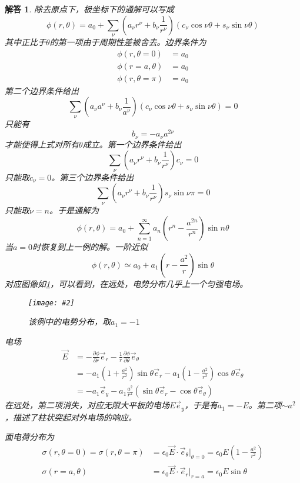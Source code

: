 \documentclass[a4paper,11pt]{ctexbook}
\newcommand{\cpic}[2]{
\begin{center}
\texttt{[image: \#2]}
\end{center}
}
\newcommand{\cpicn}[3]
{
\begin{figure}[H]
\cpic{#1}{#2}
\caption{#3\label{#2}}
\end{figure}
}
\newtheorem{ans}{解答}[section]
\newcommand{\beq}{\begin{equation}}
\newcommand{\eeq}{\end{equation}}
\newcommand{\bea}{\begin{equation}\begin{aligned}}
\newcommand{\eea}{\end{aligned}\end{equation}}
\newcommand{\epv}{\epsilon_0}
\newcommand{\pfrac}[2]{\frac{\partial #1}{\partial #2}}
\begin{document}
\begin{ans}
除去原点下，极坐标下的通解可以写成
\beq
\phi(r,\theta) = a_0 + \sum_{\nu} \left(a_\nu r^\nu + b_\nu \frac{1}{r^\nu} \right) \left( c_\nu \cos \nu \theta + s_\nu \sin \nu \theta \right)
\eeq
其中正比于$\theta$的第一项由于周期性差被舍去。边界条件为
\bea
\phi(r,\theta = 0) &= a_0\\
\phi(r=a,\theta)&=a_0\\
\phi(r,\theta = \pi) &= a_0
\eea
第二个边界条件给出
\beq
\sum_\nu \left(a_\nu a^\nu + b_\nu \frac{1}{a^\nu} \right) \left( c_\nu \cos \nu \theta + s_\nu \sin \nu \theta \right) = 0
\eeq
只能有
\beq
b_\nu = - a_\nu a^{2\nu}
\eeq
才能使得上式对所有$\theta$成立。第一个边界条件给出
\beq
\sum_\nu \left(a_\nu r^\nu + b_\nu \frac{1}{r^\nu} \right) c_\nu = 0
\eeq
只能取$c_\nu =0$。第三个边界条件给出
\beq
\sum_{\nu} \left(a_\nu r^\nu + b_\nu \frac{1}{r^\nu} \right) s_\nu \sin \nu \pi = 0
\eeq
只能取$\nu = n$。于是通解为
\beq
\phi(r,\theta) = a_0 + \sum_{n=1}^\infty a_n \left(r^n - \frac{a^{2n}}{r^n}\right) \sin n \theta
\eeq
当$a=0$时恢复到上一例的解。一阶近似
\beq
\phi(r,\theta) \simeq a_0 + a_1 \left(r-\frac{a^2}{r}\right) \sin \theta
\eeq
对应图像如\cref{2_3p2}，可以看到，在远处，电势分布几乎上一个匀强电场。
\cpicn{0.3}{2_3p2}{该例中的电势分布，取$a_1 = -1$}
电场
\bea
\vec{E} &= -\pfrac{\phi}{r} \vec{e}_r - \frac{1}{r} \pfrac{\phi}{\theta} \vec{e}_\theta \\
&= -a_1\left( 1 + \frac{a^2}{r^2} \right) \sin \theta \vec{e}_r - a_1 \left(1 - \frac{a^2}{r^2}\right)\cos \theta \vec{e}_\theta \\
&= -a_1 \vec{e}_y -a_1 \frac{a^2}{r^2} (\sin \theta \vec{e}_r-\cos \theta \vec{e}_\theta)
\eea
在远处，第二项消失，对应无限大平板的电场$E\vec{e}_y$，于是有$a_1 = -E$。第二项$\sim a^2$，描述了柱状突起对外电场的响应。
\par
面电荷分布为
\bea
\sigma(r,\theta = 0) = \sigma(r,\theta = \pi) &= \epv \vec{E}\cdot \vec{e}_\theta \big|_{\theta = 0} = \epv E\left(1 - \frac{a^2}{r^2}\right) \\
\sigma(r=a,\theta) &= \epv \vec{E} \cdot \vec{e}_r \big|_{r=a} = \epv E\sin \theta
\eea
\par


\end{ans}
\end{document}
